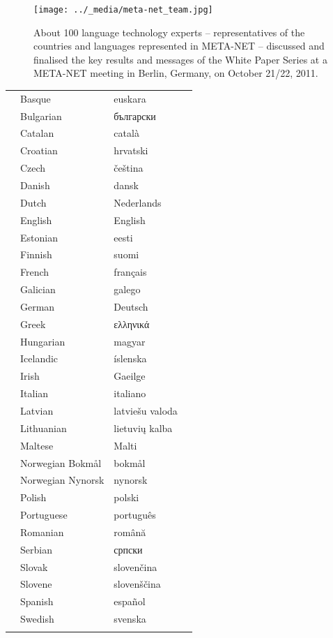 \renewcommand*{\figureformat}{}
\renewcommand*{\captionformat}{}

\begin{figure}[p]
  \center
  \texttt{[image: ../\_media/meta-net\_team.jpg]}
  \caption{About 100 language technology experts -- representatives of the countries and languages represented in META-NET -- discussed and finalised the key results and messages of the White Paper Series at a META-NET meeting in Berlin, Germany, on October 21/22, 2011.}
  \medskip
\end{figure}

\cleardoublepage

\label{whitepaperseries}

\vspace*{-5mm}
\centering
  \setlength{\tabcolsep}{3.7em}
  \begin{tabularx}{\textwidth}{llll} \toprule\addlinespace
& Basque & euskara& \\
& Bulgarian & български& \\
& Catalan & català& \\
& Croatian & hrvatski& \\
& Czech & čeština& \\
& Danish & dansk& \\
& Dutch & Nederlands& \\
& English & English& \\
& Estonian & eesti& \\
& Finnish & suomi& \\
& French & français& \\
& Galician & galego& \\
& German & Deutsch& \\
& Greek & ελληνικά& \\
& Hungarian & magyar& \\
& Icelandic & íslenska& \\
& Irish & Gaeilge& \\
& Italian & italiano& \\
& Latvian & latviešu valoda& \\
& Lithuanian & lietuvių kalba& \\
& Maltese & Malti& \\
& Norwegian Bokmål & bokmål& \\
& Norwegian Nynorsk & nynorsk& \\
& Polish & polski& \\
& Portuguese & português& \\
& Romanian & română& \\
& Serbian & српски& \\
& Slovak & slovenčina& \\
& Slovene & slovenščina& \\
& Spanish & español& \\
& Swedish & svenska& \\ \addlinespace \bottomrule
\end{tabularx}


